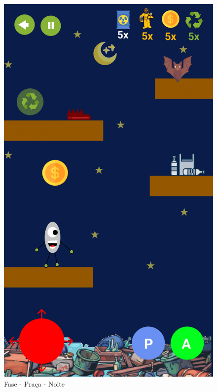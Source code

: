 \documentclass[]{scrartcl}
\begin{document}
\begin{figure}[H]
	\begin{center}
		\includegraphics[scale=0.3]{figs/Game Design-13.png}
		\caption{Fase - Praça - Noite}
	\end{center}
\end{figure}
\end{document}
